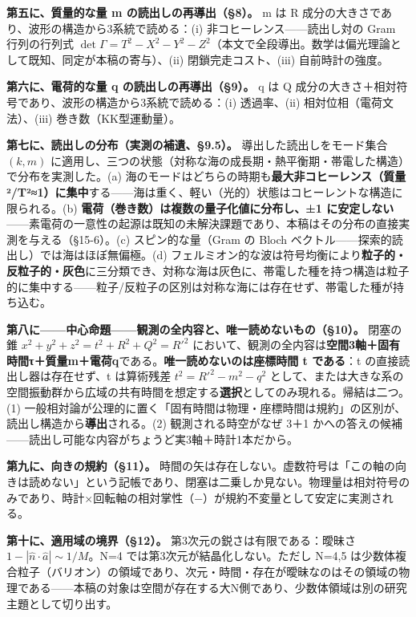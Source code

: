 \documentclass[
  a4paper,
]{ltjsarticle}
\begin{document}
\textbf{第五に、質量的な量 m の読出しの再導出（§8）。} m は R
成分の大きさであり、波形の構造から3系統で読める：(i)
非コヒーレンス------読出し対の Gram 行列の行列式
\(\det\Gamma = T^2-X^2-Y^2-Z^2\)（本文で全段導出。数学は偏光理論として既知、同定が本稿の寄与）、(ii)
閉鎖完走コスト、(iii) 自前時計の強度。

\textbf{第六に、電荷的な量 q の読出しの再導出（§9）。} q は Q
成分の大きさ＋相対符号であり、波形の構造から3系統で読める：(i)
透過率、(ii) 相対位相（電荷文法）、(iii) 巻き数（KK型運動量）。

\textbf{第七に、読出しの分布（実測の補遺、§9.5）。}
導出した読出しをモード集合 \((k,m)\)
に適用し、三つの状態（対称な海の成長期・熱平衡期・帯電した構造）で分布を実測した。(a)
海のモードはどちらの時期も\textbf{最大非コヒーレンス（質量²/T²≈1）に集中}する------海は重く、軽い（光的）状態はコヒーレントな構造に限られる。(b)
\textbf{電荷（巻き数）は複数の量子化値に分布し、±1
に安定しない}------素電荷の一意性の起源は既知の未解決課題であり、本稿はその分布の直接実測を与える（§15-6）。(c)
スピン的な量（Gram の Bloch
ベクトル------探索的読出し）では海はほぼ無偏極。(d)
フェルミオン的な波は符号均衡により\textbf{粒子的・反粒子的・灰色}に三分類でき、対称な海は灰色に、帯電した種を持つ構造は粒子的に集中する------粒子/反粒子の区別は対称な海には存在せず、帯電した種が持ち込む。

\textbf{第八に------中心命題------観測の全内容と、唯一読めないもの（§10）。}
閉塞の錐 \(x^2+y^2+z^2 = t^2+R^2+Q^2 = R'^2\)
において、観測の全内容は\textbf{空間3軸＋固有時間τ＋質量m＋電荷q}である。\textbf{唯一読めないのは座標時間
t である}：t の直接読出し器は存在せず、t は算術残差 \(t^2=R'^2-m^2-q^2\)
として、または大きな系の空間振動群から広域の共有時間を想定する\textbf{選択}としてのみ現れる。帰結は二つ。(1)
一般相対論が公理的に置く「固有時間は物理・座標時間は規約」の区別が、読出し構造から\textbf{導出}される。(2)
観測される時空がなぜ 3＋1
かへの答えの候補------読出し可能な内容がちょうど実3軸＋時計1本だから。

\textbf{第九に、向きの規約（§11）。}
時間の矢は存在しない。虚数符号は「この軸の向きは読めない」という記帳であり、閉塞は二乗しか見ない。物理量は相対符号のみであり、時計×回転軸の相対掌性（−）が規約不変量として安定に実測される。

\textbf{第十に、適用域の境界（§12）。} 第3次元の鋭さは有限である：曖昧さ
\(1-|\hat n\cdot\hat a| \sim 1/M\)。N=4
では第3次元が結晶化しない。ただし N=4,5
は少数体複合粒子（バリオン）の領域であり、次元・時間・存在が曖昧なのはその領域の物理である------本稿の対象は空間が存在する大N側であり、少数体領域は別の研究主題として切り出す。
\end{document}
